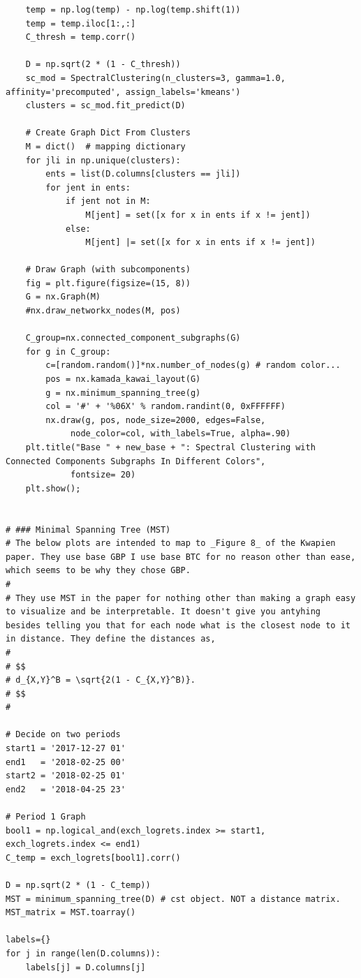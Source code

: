 \documentclass[a4paper]{article}
\begin{document}
\begin{lstlisting}
    temp = np.log(temp) - np.log(temp.shift(1))
    temp = temp.iloc[1:,:]
    C_thresh = temp.corr()

    D = np.sqrt(2 * (1 - C_thresh))
    sc_mod = SpectralClustering(n_clusters=3, gamma=1.0, affinity='precomputed', assign_labels='kmeans')
    clusters = sc_mod.fit_predict(D)

    # Create Graph Dict From Clusters
    M = dict()  # mapping dictionary
    for jli in np.unique(clusters):
        ents = list(D.columns[clusters == jli])
        for jent in ents:
            if jent not in M:
                M[jent] = set([x for x in ents if x != jent])
            else:
                M[jent] |= set([x for x in ents if x != jent])

    # Draw Graph (with subcomponents)
    fig = plt.figure(figsize=(15, 8))
    G = nx.Graph(M)
    #nx.draw_networkx_nodes(M, pos)

    C_group=nx.connected_component_subgraphs(G)
    for g in C_group:
        c=[random.random()]*nx.number_of_nodes(g) # random color...
        pos = nx.kamada_kawai_layout(G)
        g = nx.minimum_spanning_tree(g)
        col = '#' + '%06X' % random.randint(0, 0xFFFFFF)
        nx.draw(g, pos, node_size=2000, edges=False,
             node_color=col, with_labels=True, alpha=.90)
    plt.title("Base " + new_base + ": Spectral Clustering with Connected Components Subgraphs In Different Colors", 
             fontsize= 20)
    plt.show();


# ### Minimal Spanning Tree (MST)
# The below plots are intended to map to _Figure 8_ of the Kwapien paper. They use base GBP I use base BTC for no reason other than ease, which seems to be why they chose GBP.
# 
# They use MST in the paper for nothing other than making a graph easy to visualize and be interpretable. It doesn't give you antyhing besides telling you that for each node what is the closest node to it in distance. They define the distances as,
# 
# $$
# d_{X,Y}^B = \sqrt{2(1 - C_{X,Y}^B)}.
# $$
# 

# Decide on two periods
start1 = '2017-12-27 01'
end1   = '2018-02-25 00'
start2 = '2018-02-25 01'
end2   = '2018-04-25 23'

# Period 1 Graph
bool1 = np.logical_and(exch_logrets.index >= start1, exch_logrets.index <= end1)
C_temp = exch_logrets[bool1].corr()  

D = np.sqrt(2 * (1 - C_temp))
MST = minimum_spanning_tree(D) # cst object. NOT a distance matrix.
MST_matrix = MST.toarray()

labels={}
for j in range(len(D.columns)):
    labels[j] = D.columns[j]
    

\end{lstlisting}
\end{document}
